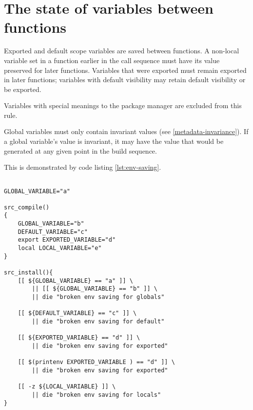 \section{The state of variables between functions}
\label{ebuild-env-state}

Exported and default scope variables are saved between functions. A non-local variable set in a
function earlier in the call sequence must have its value preserved for later functions. Variables
that were exported must remain exported in later functions; variables with default visibility may
retain default visibility or be exported.

Variables with special meanings to the package manager are excluded from this rule.

Global variables must only contain invariant values (see \ref{metadata-invariance}). If a global
variable's value is invariant, it may have the value that would be generated at any given point
in the build sequence.

This is demonstrated by code listing \ref{lst:env-saving}.

\begin{lstlisting}[float,caption=Environment state between functions,label=lst:env-saving]

GLOBAL_VARIABLE="a"

src_compile()
{
    GLOBAL_VARIABLE="b"
    DEFAULT_VARIABLE="c"
    export EXPORTED_VARIABLE="d"
    local LOCAL_VARIABLE="e"
}

src_install(){
    [[ ${GLOBAL_VARIABLE} == "a" ]] \
        || [[ ${GLOBAL_VARIABLE} == "b" ]] \
        || die "broken env saving for globals"

    [[ ${DEFAULT_VARIABLE} == "c" ]] \
        || die "broken env saving for default"

    [[ ${EXPORTED_VARIABLE} == "d" ]] \
        || die "broken env saving for exported"

    [[ $(printenv EXPORTED_VARIABLE ) == "d" ]] \
        || die "broken env saving for exported"

    [[ -z ${LOCAL_VARIABLE} ]] \
        || die "broken env saving for locals"
}
\end{lstlisting}

